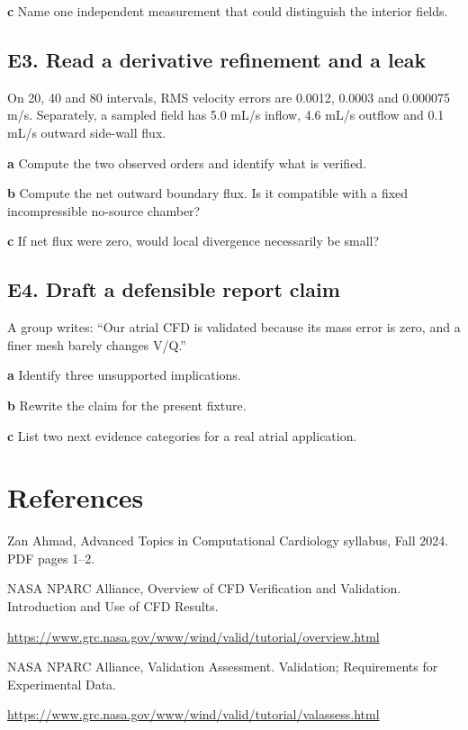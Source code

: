 \documentclass[11pt,letterpaper]{article}
\theoremstyle{definition}\newtheorem{definition}{Definition}\newtheorem{example}{Example}
\numberwithin{equation}{section}
\begin{document}
\textbf{c} Name one independent measurement that could distinguish the interior fields.

\par\noindent\begin{minipage}{\linewidth}
\subsection*{E3. Read a derivative refinement and a leak}
On 20, 40 and 80 intervals, RMS velocity errors are 0.0012, 0.0003 and 0.000075 m/s. Separately, a sampled field has 5.0 mL/s inflow, 4.6 mL/s outflow and 0.1 mL/s outward side-wall flux.

\textbf{a} Compute the two observed orders and identify what is verified.

\end{minipage}\par\medskip
\textbf{b} Compute the net outward boundary flux. Is it compatible with a fixed incompressible no-source chamber?

\textbf{c} If net flux were zero, would local divergence necessarily be small?

\par\noindent\begin{minipage}{\linewidth}
\subsection*{E4. Draft a defensible report claim}
A group writes: ``Our atrial CFD is validated because its mass error is zero, and a finer mesh barely changes V/Q.''

\textbf{a} Identify three unsupported implications.

\end{minipage}\par\medskip
\textbf{b} Rewrite the claim for the present fixture.

\textbf{c} List two next evidence categories for a real atrial application.

\section*{References}
\noindent\begin{minipage}{\linewidth}
Zan Ahmad, Advanced Topics in Computational Cardiology syllabus, Fall 2024. PDF pages 1--2.

\end{minipage}\par\medskip
\noindent\begin{minipage}{\linewidth}
NASA NPARC Alliance, Overview of CFD Verification and Validation. Introduction and Use of CFD Results.

\url{https://www.grc.nasa.gov/www/wind/valid/tutorial/overview.html}
\end{minipage}\par\medskip
\noindent\begin{minipage}{\linewidth}
NASA NPARC Alliance, Validation Assessment. Validation; Requirements for Experimental Data.

\url{https://www.grc.nasa.gov/www/wind/valid/tutorial/valassess.html}
\end{minipage}\par\medskip
\end{document}
